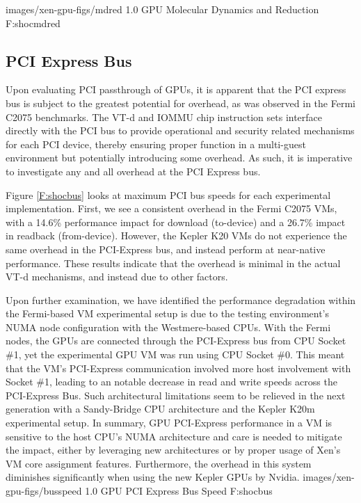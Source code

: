   {images/xen-gpu-figs/mdred}
  {1.0}
  {GPU Molecular Dynamics and Reduction}
  {F:shocmdred} 



\subsection{PCI Express Bus}

Upon evaluating PCI passthrough of GPUs, it is apparent that the PCI express bus is subject to the greatest potential for overhead, as was observed in the Fermi C2075 benchmarks. The VT-d and IOMMU chip instruction sets interface directly with the PCI bus to provide operational and security related mechanisms for each PCI device, thereby ensuring proper function in a multi-guest environment but potentially introducing some overhead. As such, it is imperative to investigate any and all overhead at the PCI Express bus. 

Figure \ref{F:shocbus} looks at maximum PCI bus speeds for each experimental implementation.  First, we see a consistent overhead in the Fermi C2075 VMs, with a 14.6\% performance impact for download (to-device) and a 26.7\% impact in readback (from-device). However, the Kepler K20 VMs do  not experience the same overhead in the PCI-Express bus, and instead perform at near-native performance.  These results indicate that the overhead is minimal in the actual VT-d mechanisms, and instead due to other factors. 




Upon further examination, we have identified the performance degradation within the Fermi-based VM experimental setup is due to the testing environment's NUMA node configuration with the Westmere-based CPUs. With the Fermi nodes, the GPUs are connected through the PCI-Express bus from CPU Socket \#1, yet the experimental GPU VM was run using CPU Socket \#0. This meant that the VM's PCI-Express communication involved more host involvement with Socket \#1, leading to an notable decrease in read and write speeds across the PCI-Express Bus. Such architectural limitations seem to be relieved in the next generation with a Sandy-Bridge CPU architecture and the Kepler K20m experimental setup. In summary, GPU PCI-Express performance in a VM is sensitive to the host CPU's NUMA architecture and care is needed to mitigate the impact, either by leveraging new architectures or by proper usage of Xen's VM core assignment features.  Furthermore, the overhead in this system diminishes significantly when using the new Kepler GPUs by Nvidia.
  {images/xen-gpu-figs/busspeed}
  {1.0}
  {GPU PCI Express Bus Speed}
  {F:shocbus} 



